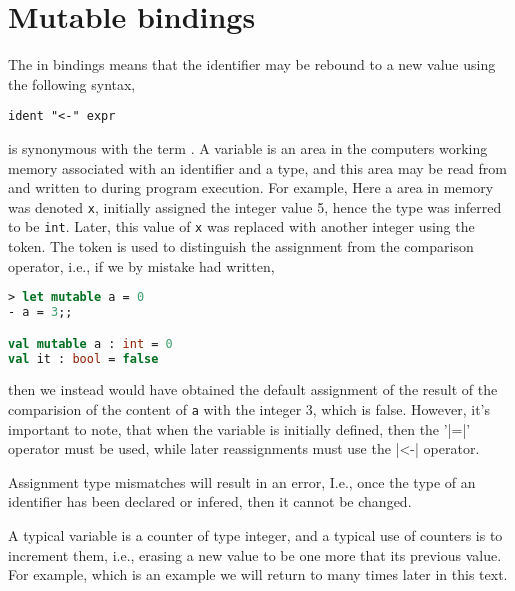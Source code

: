\section{Mutable bindings}
\label{sec:mutableValues}
The  in  bindings means that the identifier may be rebound to a new value using the following syntax,
%
\begin{lstlisting}[language=EBNF]
ident "<-" expr
\end{lstlisting}
 is synonymous with the term . A variable is an area in the computers working memory associated with an identifier and a type, and this area may be read from and written to during program execution. For example,
%
%
Here a area in memory was denoted \texttt{x}, initially assigned the integer value 5, hence the type was inferred to be \lstinline|int|.  Later, this value of \texttt{x} was replaced with another integer using the \idx{\token{<-}} token. The \token{<-} token is used to distinguish the assignment from the comparison operator, i.e., if we by mistake had written,
%
\begin{lstlisting}[language=fsharp,caption={fsharpi, example of changing the content of a variable.}]
> let mutable a = 0
- a = 3;;

val mutable a : int = 0
val it : bool = false
\end{lstlisting}
%
then we instead would have obtained the default assignment of the result of the comparision of the content of \lstinline|a| with the integer 3, which is false. However, it's important to note, that when the variable is initially defined, then the '\token|=|' operator must be used, while later reassignments must use the \token|<-|  operator. 

Assignment type mismatches will result in an error, 
%
%
I.e., once the type of an identifier has been declared or infered, then it cannot be changed.

A typical variable is a counter of type integer, and a typical use of counters is to increment them, i.e., erasing a new value to be one more that its previous value. For example,
%
%
which is an example we will return to many times later in this text.


